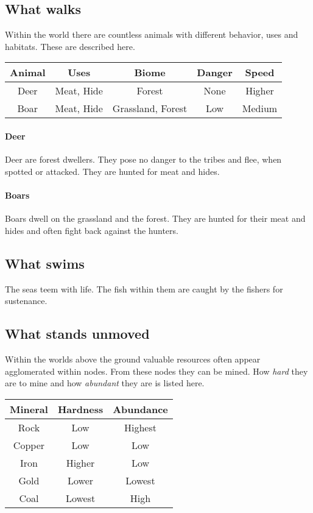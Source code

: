 \subsection{What walks}\label{ch:Goods:Nature:Animals}
Within the world there are countless animals with different behavior, uses and
habitats. These are described here.

\begin{longtable}{ccccc}
	\toprule
	Animal & Uses       & Biome & Danger & Speed  \\
	\midrule
	Deer   & Meat, Hide & Forest            & None   & Higher \\
	Boar   & Meat, Hide & Grassland, Forest & Low    & Medium \\
	\bottomrule
\end{longtable}

\paragraph{Deer}
Deer are forest dwellers. They pose no danger to the tribes and flee, when
spotted or attacked. They are hunted for meat and hides.

\paragraph{Boars}
Boars dwell on the grassland and the forest. They are hunted for their meat and
hides and often fight back against the hunters.

\subsection{What swims}\label{ch:Goods:Nature:Sea}
The seas teem with life. The fish within them are caught by the fishers for
sustenance.

\subsection{What stands unmoved}\label{ch:Goods:Nature:Minerals}
Within the worlds above the ground valuable resources often appear agglomerated
within nodes. From these nodes they can be mined. How \emph{hard} they are to
mine and how \emph{abundant} they are is listed here.

\begin{longtable}{ccc}
	\toprule
	Mineral & Hardness & Abundance \\
	\midrule
	Rock    & Low      & Highest   \\
	Copper  & Low      & Low       \\
	Iron    & Higher   & Low       \\
	Gold    & Lower    & Lowest    \\
	Coal    & Lowest   & High      \\
	\bottomrule
\end{longtable}

